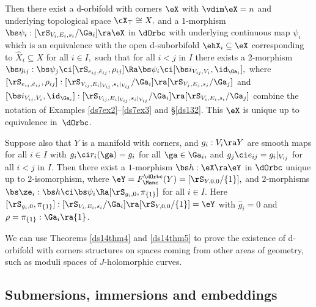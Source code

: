 \documentclass{article}
\begin{document}
\begin{thm}
Then there exist a d-orbifold with corners\/ $\eX$ with\/
$\vdim\eX=n$ and underlying topological space $\cX_\top\cong X,$ and
a $1$-morphism $\bs\psi_i:[\rS_{V_i,E_i,s_i}/\Ga_i]\ra\eX$ in
$\dOrbc$ with underlying continuous map $\psi_i$ which is an
equivalence with the open d-suborbifold\/ $\ehX_i\subseteq\eX$
corresponding to $\hat X_i\subseteq X$ for all\/ $i\in I,$ such that
for all\/ $i<j$ in $I$ there exists a $2$-morphism\/
$\bs\eta_{ij}:\bs\psi_j\ci[\rS_{e_{ij},\hat
e_{ij}},\rho_{ij}]\Ra\bs\psi_i\ci[\bs i_{V_{ij},V_i},\id_{\Ga_i}],$
where $[\rS_{e_{ij},\hat e_{ij}},\rho_{ij}]:
[\rS_{V_{ij},E_i\vert_{V_{ij}},s_i\vert_{V_{ij}}}/\Ga_i]\ra
[\rS_{V_j,E_j,s_j}/\Ga_j]$ and\/ $[\bs i_{V_{ij},V_i},
\id_{\Ga_i}]:[\rS_{V_{ij}, E_i\vert_{V_{ij}},s_i\vert_{V_{ij}}}
/\Ga_i]\ra[\rS_{V_i,E_i,s_i}/\Ga_j]$ combine the notation of
Examples\/ {\rm\ref{ds7ex2}--\ref{ds7ex3}} and\/
{\rm\S\ref{ds132}}. This $\eX$ is unique up to
equivalence in~$\dOrbc$.

Suppose also that\/ $Y$ is a manifold with corners, and\/
$g_i:V_i\ra Y$ are smooth maps for all\/ $i\in I$ with\/ $g_i\ci
r_i(\ga)= g_i$ for all\/ $\ga\in\Ga_i,$ and\/ $g_j\ci
e_{ij}=g_i\vert_{V_{ij}}$ for all\/ $i<j$ in $I$. Then there exist a
$1$-morphism $\bs h:\eX\ra\eY$ in $\dOrbc$ unique up to
$2$-isomorphism, where $\eY=F_\Manc^\dOrbc(Y)=[\rS_{Y,0,0}/\{1\}],$
and\/ $2$-morphisms $\bs\ze_i:\bs
h\ci\bs\psi_i\Ra[\rS_{g_i,0},\pi_{\{1\}}]$ for all\/ $i\in I$. Here
$[\rS_{g_i,0},\pi_{\{1\}}]:[\rS_{V_i,E_i,s_i}/\Ga_i]\ra
[\rS_{Y,0,0}/\{1\}]=\eY$ with\/ $\hat g_i=0$
and\/~$\rho=\pi_{\{1\}}:\Ga_i\ra\{1\}$.
\label{ds14thm5}
\end{thm}

We can use Theorems \ref{ds14thm4} and \ref{ds14thm5} to prove the
existence of d-orbifold with corners structures on spaces coming
from other areas of geometry, such as moduli spaces of
$J$-holomorphic curves.

\subsection{Submersions, immersions and embeddings}
\label{ds144}
\end{document}
